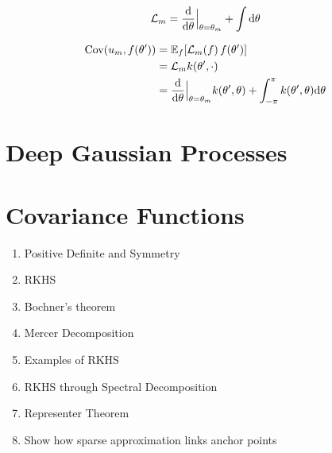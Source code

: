 \begin{equation}
  \mathcal{L}_m = \frac{\mathrm{d}{}}{\mathrm{d}{\theta}}\Bigr|_{\theta = \theta_m} + \int \mathrm{d}{\theta}
\end{equation}

\begin{align}
  \Cov(u_m, f(\theta')) &= \Exp{f}{\mathcal{L}_m(f)\,f(\theta')} \\
                      &=  \mathcal{L}_m k(\theta', \cdot) \\
                      &= \frac{\calcd{}}{\calcd{\theta}}\Bigr|_{\theta = \theta_m} k(\theta', \theta) + \int_{-\pi}^\pi k(\theta', \theta) \calcd{\theta}
\end{align}



\section{Deep Gaussian Processes}



\section{Covariance Functions}

\begin{enumerate}
  \item Positive Definite and Symmetry
  \item RKHS
  \item Bochner's theorem
  \item Mercer Decomposition
  \item Examples of RKHS
  \item RKHS through Spectral Decomposition
  \item Representer Theorem
  \item Show how sparse approximation links anchor points
\end{enumerate}
